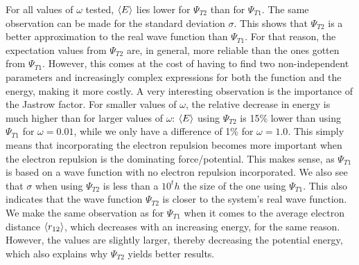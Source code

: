 \documentclass[10pt,a4paper]{article}
\begin{document}
For all values of $\omega$ tested, $\braket{E}$ lies lower for $\Psi_{T2}$ than for $\Psi_{T1}$. The same observation can be made for the standard deviation $\sigma$. This shows that $\Psi_{T2}$ is a better approximation to the real wave function than $\Psi_{T1}$. For that reason, the expectation values from $\Psi_{T2}$ are, in general, more reliable than the ones gotten from $\Psi_{T1}$. However, this comes at the cost of having to find two non-independent parameters and increasingly complex expressions for both the function and the energy, making it more costly. 
A very interesting observation is the importance of the Jastrow factor. For smaller values of $\omega$, the relative decrease in energy is much higher than for larger values of  $\omega$: $\braket{E}$  using $\Psi_{T2}$ is 15\% lower than using $\Psi_{T1}$ for $\omega=0.01$, while we only have a difference of 1\% for $\omega=1.0$. This simply means that incorporating the electron repulsion becomes more important when the electron repulsion is the dominating force/potential. This makes sense, as $\Psi_{T1}$ is based on a wave function with no electron repulsion incorporated. We also see that $\sigma$ when using $\Psi_{T2}$ is less than a $10^th$ the size of the one using  $\Psi_{T1}$. This also indicates that the wave function $\Psi_{T2}$ is closer to the system's real wave function. \\
We make the same observation as for $\Psi_{T1}$ when it comes to the average electron distance $\braket{r_{12}}$, which decreases with an increasing energy, for the same reason. However, the values are slightly larger, thereby decreasing the potential energy, which also explains why $\Psi_{T2}$ yields better results.
\end{document}
